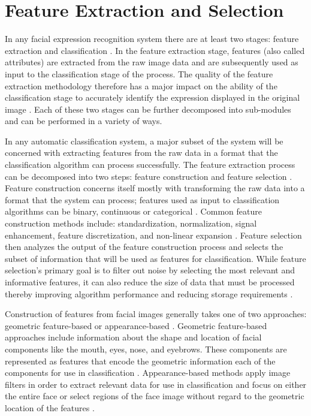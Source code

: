 



%


\section{Feature Extraction and Selection} \label{FeatureExtraction}
In any facial expression recognition system there are at least two stages: feature extraction and classification \cite{lajevardi2012automatic}. In the feature extraction stage, features (also called attributes) are extracted from the raw image data and are subsequently used as input to the classification stage of the process. The quality of the feature extraction methodology therefore has a major impact on the ability of the classification stage to accurately identify the expression displayed in the original image \cite{lajevardi2012automatic}. Each of these two stages can be further decomposed into sub-modules and can be performed in a variety of ways. 

 In any automatic classification system, a major subset of the system will be concerned with extracting features from the raw data in a format that the classification algorithm can process successfully. The feature extraction process can be decomposed into two steps: feature construction and feature selection \cite{guyon2008feature}. Feature construction concerns itself mostly with transforming the raw data into a format that the system can process; features used as input to classification algorithms can be binary, continuous or categorical \cite{guyon2008feature}. Common feature construction methods include: standardization, normalization, signal enhancement, feature discretization, and non-linear expansion \cite{guyon2008feature}. Feature selection then analyzes the output of the feature construction process and selects the subset of information that will be used as features for classification. While feature selection's primary goal is to filter out noise by selecting the most relevant and informative features, it can also reduce the size of data that must be processed thereby improving algorithm performance and reducing storage requirements \cite{guyon2008feature}.

Construction of features from facial images generally takes one of two approaches: geometric feature-based or appearance-based \cite{tian2011facial}. Geometric feature-based approaches include information about the shape and location of facial components like the mouth, eyes, nose, and eyebrows. These components are represented as features that encode the geometric information each of the components for use in classification \cite{tian2011facial}. Appearance-based methods  apply image filters in order to extract relevant data for use in classification and focus on either the entire face or select regions of the face image without regard to the geometric location of the features \cite{tian2011facial}. 
 
